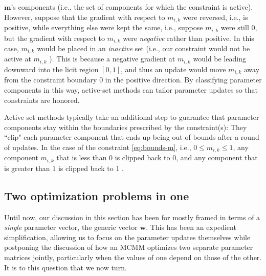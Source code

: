 $\textbf{m}$'s components (i.e., the set of components for which the constraint is active).
However, suppose that the gradient with respect to $m_{i,k}$ were reversed, i.e., is positive, while everything else were kept the same, i.e., suppose 
$m_{i,k}$ were still $0$, but the gradient with respect to $m_{i,k}$ were \emph{negative} 
rather than positive. 
In this case, $m_{i,k}$ would be placed in an \emph{inactive} set (i.e., our constraint 
would not be active at $m_{i,k}$ ). This is because a negative
gradient at $m_{i,k}$ would be leading downward into the licit region $[0,1]$, and 
thus an update would move $m_{i,k}$ away from the constraint boundary $0$ in the 
positive direction. 
By classifying 
parameter components in this way, active-set methods can tailor parameter updates 
so that constraints are honored. 

Active set methods typically take an 
additional step to guarantee that parameter components stay within the boundaries 
prescribed by the constraint(s): They ``clip" each parameter component that ends up being out 
of bounds after a round of updates. In the case of the constraint \eqref{eq:bounds-m}, i.e., $0 \leq m_{i,k} \leq 1$,
any component $m_{i,k}$ that is less than $0$ is clipped back to $0$, and any component that is greater 
than $1$ is clipped back to 1 \citep{ni:yuan:1997}.


\subsection{Two optimization problems in one}
\label{sec:two-in-one}
Until now, our discussion in this section has been for mostly framed in terms of a 
\emph{single} parameter vector, the generic vector $\textbf{w}$. 
This has been an expedient simplification, allowing us to focus on the parameter 
updates themselves while postponing
the discussion of how an MCMM optimizes two separate parameter matrices
jointly, particularly when the values of one depend on those of the other. 
It is to this question that we now turn.

